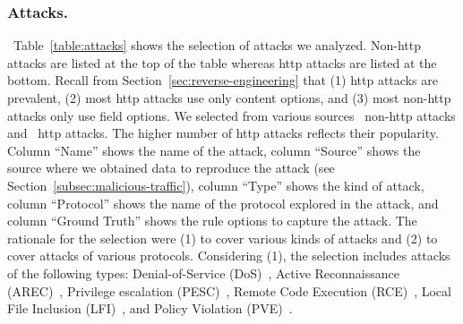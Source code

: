 \documentclass[sigconf,review, anonymous]{acmart}
\begin{document}
\subsubsection{Attacks.}~Table~\ref{table:attacks} shows the selection
of attacks we analyzed.  Non-http attacks are listed at the top of the
table whereas http attacks are listed at the bottom. Recall from
Section~\ref{sec:reverse-engineering} that (1) http attacks are
prevalent, (2) most http attacks use only content options, and (3)
most non-http attacks only use field options. We selected from various
sources \numNonContentAttacks\ non-http attacks and
\numContentAttacks\ http attacks. The higher number of http attacks
reflects their popularity. Column ``Name'' shows the name of the
attack, column ``Source'' shows the source where we obtained data to
reproduce the attack (see Section~\ref{subsec:malicious-traffic}),
column ``Type'' shows the kind of attack, column ``Protocol'' shows
the name of the protocol explored in the attack, and column ``Ground
Truth'' shows the rule options to capture the attack. The rationale
for the selection were (1) to cover various kinds of attacks and (2)
to cover attacks of various protocols. Considering (1), the selection
includes attacks of the following types: Denial-of-Service
(DoS)~\cite{denial-of-service}, Active Reconnaissance
(AREC)~\cite{active-reconnaissance}, Privilege escalation
(PESC)~\cite{privilege-escalation}, Remote Code Execution
(RCE)~\cite{remote-code-execution}, Local File Inclusion
(LFI)~\cite{local-file-inclusion}, and Policy Violation
(PVE)~.

\vspace{1ex}
\end{document}
